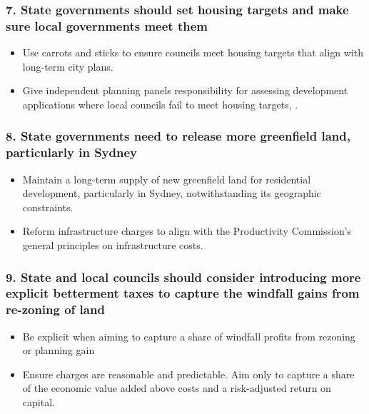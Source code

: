 \documentclass[FrontPage]{grattan}
\begin{document}
\subsubsection{7. State governments should set housing targets and make sure local governments meet them}
\begin{itemize}
\item Use carrots and sticks to ensure councils meet housing targets that align with long-term city plans.
\item Give independent planning panels responsibility for assessing development applications where local councils fail to meet housing targets, .
\end{itemize}
\eject
\null
\vspace*{-0.6\baselineskip}  
\subsubsection{8. State governments need to release more greenfield land, particularly in Sydney}
\begin{itemize}
\item Maintain a long-term supply of new greenfield land for residential development, particularly in Sydney, notwithstanding its geographic constraints.
\item Reform infrastructure charges to align with the Productivity Commission’s general principles on infrastructure costs.
\end{itemize}

\subsubsection{9. State and local councils should consider introducing more explicit betterment taxes to capture the windfall gains from re-zoning of land}
\begin{itemize}
\item Be explicit when aiming to capture a share of windfall profits from rezoning or planning gain
\item Ensure charges are reasonable and predictable.
Aim only to capture a share of the economic value added above costs and a risk-adjusted return on capital.
\end{itemize}


\end{document}
